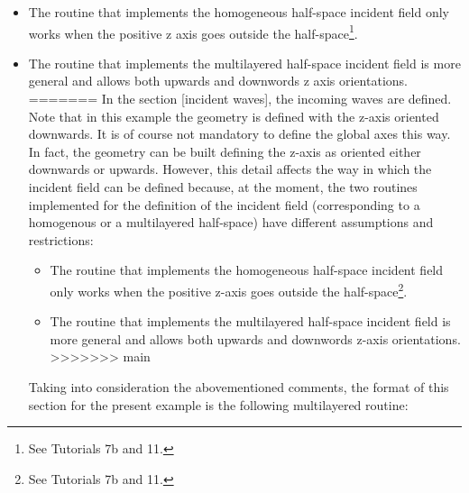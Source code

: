 \documentclass[a4]{article}
\begin{document}
\begin{itemize}
	\item The routine that implements the homogeneous half-space incident field only works when the positive z axis goes outside the half-space\footnote{See Tutorials 7b and 11.}.
	
	\item The routine that implements the multilayered half-space incident field is more general and allows both upwards and downwords z axis orientations.
=======
In the section [incident waves], the incoming waves are defined. Note that in this example the geometry is defined with the z-axis oriented downwards. It is of course not mandatory to define the global axes this way. In fact, the geometry can be built defining the z-axis as oriented either downwards or upwards. However, this detail affects the way in which the incident field can be defined because, at the moment, the two routines implemented for the definition of the incident field (corresponding to a homogenous or a multilayered half-space) have different assumptions and restrictions:

\begin{itemize}
	\item The routine that implements the homogeneous half-space incident field only works when the positive z-axis goes outside the half-space\footnote{See Tutorials 7b and 11.}.
	
	\item The routine that implements the multilayered half-space incident field is more general and allows both upwards and downwords z-axis orientations.
>>>>>>> main
\end{itemize}

Taking into consideration the abovementioned comments, the format of this section for the present example is the following multilayered routine:


\end{itemize}
\end{document}
